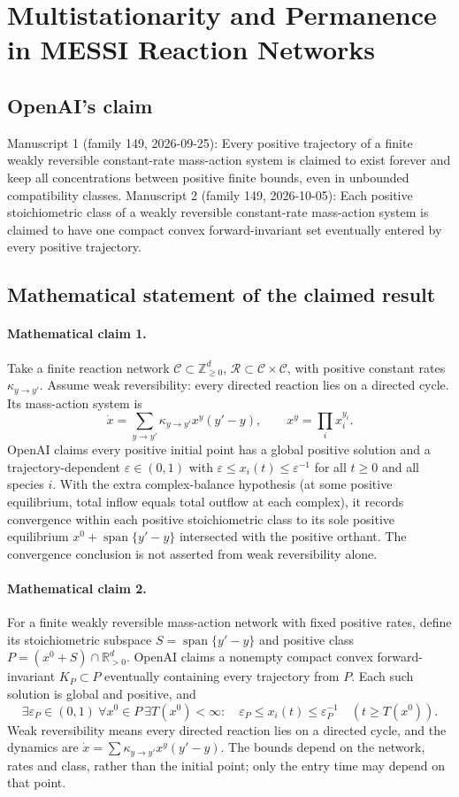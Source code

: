 \documentclass[11pt]{article}
\begin{document}
\section*{Multistationarity and Permanence in MESSI Reaction Networks}

\subsection{OpenAI's claim}
Manuscript 1 (family 149, 2026-09-25): Every positive trajectory of a finite weakly reversible constant-rate mass-action system is claimed to exist forever and keep all concentrations between positive finite bounds, even in unbounded compatibility classes. Manuscript 2 (family 149, 2026-10-05): Each positive stoichiometric class of a weakly reversible constant-rate mass-action system is claimed to have one compact convex forward-invariant set eventually entered by every positive trajectory.

\subsection{Mathematical statement of the claimed result}
\paragraph{Mathematical claim 1.} Take a finite reaction network $\mathcal C\subset\mathbb Z_{\ge0}^d$, $\mathcal R\subset\mathcal C\times\mathcal C$, with positive constant rates $\kappa_{y\to y'}$. Assume weak reversibility: every directed reaction lies on a directed cycle. Its mass-action system is
\[
\dot x=\sum_{y\to y'}\kappa_{y\to y'}x^y(y'-y),\qquad x^y=\prod_i x_i^{y_i}.
\]
OpenAI claims every positive initial point has a global positive solution and a trajectory-dependent $\varepsilon\in(0,1)$ with $\varepsilon\le x_i(t)\le\varepsilon^{-1}$ for all $t\ge0$ and all species $i$.
With the extra complex-balance hypothesis (at some positive equilibrium, total inflow equals total outflow at each complex), it records convergence within each positive stoichiometric class to its sole positive equilibrium $x^0+\operatorname{span}\{y'-y\}$ intersected with the positive orthant. The convergence conclusion is not asserted from weak reversibility alone.

\paragraph{Mathematical claim 2.} For a finite weakly reversible mass-action network with fixed positive rates, define its stoichiometric subspace $S=\operatorname{span}\{y'-y\}$ and positive class $P=(x^0+S)\cap\mathbb R_{>0}^d$. OpenAI claims a nonempty compact convex forward-invariant $K_P\subset P$ eventually containing every trajectory from $P$. Each such solution is global and positive, and
\[
\exists\varepsilon_P\in(0,1)\ \forall x^0\in P\ \exists T(x^0)<\infty:\quad
\varepsilon_P\le x_i(t)\le\varepsilon_P^{-1}\quad(t\ge T(x^0)).
\]
Weak reversibility means every directed reaction lies on a directed cycle, and the dynamics are $\dot x=\sum\kappa_{y\to y'}x^y(y'-y)$. The bounds depend on the network, rates and class, rather than the initial point; only the entry time may depend on that point.
\end{document}
